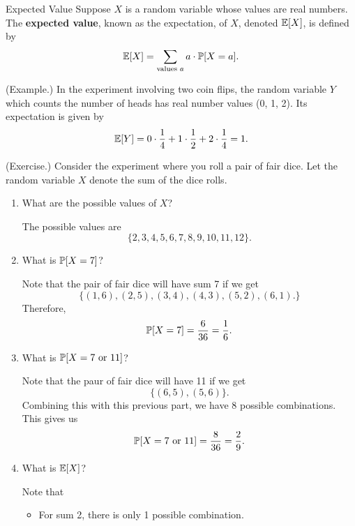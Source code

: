\documentclass[letterpaper]{article}
\newcommand{\0}{\mathbf{0}}
\begin{document}
\begin{definition}{Expected Value}{}
    Suppose $X$ is a random variable whose values are real numbers. The \textbf{expected value}, known as the expectation, of $X$, denoted $\mathbb{E}[X]$, is defined by \[\mathbb{E}[X] = \sum_{\text{values } a} a \cdot \mathbb{P}[X = a].\]
\end{definition}

\begin{mdframed}
    (Example.) In the experiment involving two coin flips, the random variable $Y$ which counts the number of heads has real number values (0, 1, 2). Its expectation is given by 
    \[\mathbb{E}[Y] = 0 \cdot \frac{1}{4} + 1 \cdot \frac{1}{2} + 2 \cdot \frac{1}{4} = 1.\]
\end{mdframed}

\begin{mdframed}
    (Exercise.) Consider the experiment where you roll a pair of fair dice. Let the random variable $X$ denote the sum of the dice rolls. 
    \begin{enumerate}
        \item What are the possible values of $X$? 
        \begin{mdframed}
            The possible values are \[\{2, 3, 4, 5, 6, 7, 8, 9, 10, 11, 12\}.\]
        \end{mdframed}
        \item What is $\mathbb{P}[X = 7]$?
        \begin{mdframed}
            Note that the pair of fair dice will have sum 7 if we get 
            \[\{(1, 6), (2, 5), (3, 4), (4, 3), (5, 2), (6, 1).\}\]
            Therefore, 
            \[\mathbb{P}[X = 7] = \frac{6}{36} = \frac{1}{6}.\]
        \end{mdframed}
        \item What is $\mathbb{P}[X = 7 \text{ or } 11]$?
        \begin{mdframed}
            Note that the paur of fair dice will have 11 if we get 
            \[\{(6, 5), (5, 6)\}.\]
            Combining this with this previous part, we have 8 possible combinations. This gives us 
            \[\mathbb{P}[X = 7 \text{ or } 11] = \frac{8}{36} = \frac{2}{9}.\]
        \end{mdframed}
        \item What is $\mathbb{E}[X]$? 
        \begin{mdframed}
            Note that
            \begin{itemize}
                \item For sum 2, there is only 1 possible combination. 

\end{itemize}
\end{mdframed}
\end{enumerate}
\end{mdframed}
\end{document}
